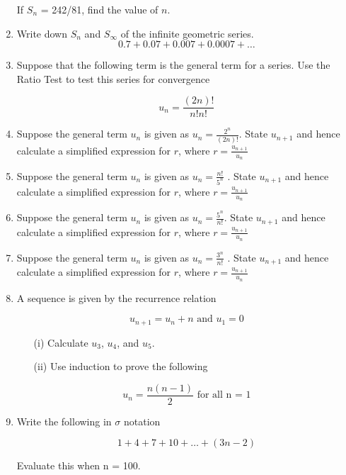 \documentclass[a4paper,12pt]{article}
\begin{document}
\begin{enumerate}
If $S_n$ = 242/81, find the value of $n$.


\item Write down $S_n$ and $S_{\infty}$ of the infinite geometric series.
\[ 0.7 + 0.07 + 0.007 + 0.0007 + \ldots  \]




	\item  Suppose that the following term is the general term for a series. Use the Ratio Test to test this series for convergence
	
	\[u_n=\frac{(2n)!}{n!n!}\]

\item  Suppose the general term $u_n$ is given as  $\displaystyle{u_n = \frac{2^n}{(2n)!} } .$ State $u_{n+1}$ and hence calculate a simplified expression for $r$, where 
	$\displaystyle{r = \frac{u_{n+1}}{u_n} }$

\item  Suppose the general term $u_n$ is given as $\displaystyle{u_n = \frac{n!}{5^n} }$ . State $u_{n+1}$ and hence calculate a simplified expression for $r$, where 
	{$\displaystyle{r = \frac{u_{n+1}}{u_n}}$	}
\item  Suppose the general term $u_n$ is given as  $\displaystyle{u_n = \frac{5^n}{n!} } .$ State $u_{n+1}$ and hence calculate a simplified expression for $r$, where 
	{	$\displaystyle{r = \frac{u_{n+1}}{u_n}}$	}
\item Suppose the general term $u_n$ is given as  $u_n = \displaystyle{\frac{3^n}{n!} }$ . State $u_{n+1}$ and hence calculate a simplified expression for $r$, where 
	{	$\displaystyle{r = \frac{u_{n+1}}{u_n}}$	}


\item A sequence is given by the recurrence relation

\[u_{n+1} = u_n + n \mbox{ and }u_1 = 0\]

\begin{itemize}

\item[(i)] Calculate $u_3$, $u_4$, and $u_5$. 

\item[(ii)] Use induction to prove the following 

\end{itemize}

\[u_n = \frac{n(n-1)}{2} \mbox{ for all n = 1} \]



\item Write the following in $\sigma$ notation

\[ 1 + 4 + 7 + 10 + \ldots + (3n - 2)\]

Evaluate this when n = 100. 


\end{enumerate}
\end{document}
